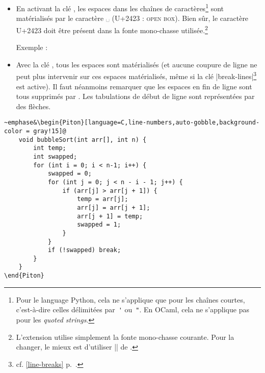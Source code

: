 \documentclass[dvipsnames,svgnames]{article}
\begin{document}
\begin{itemize}
Cette clé peut prendre comme valeur une longueur explicite mais aussi la valeur spéciale~|min|. Avec cette valeur,
la largeur sera calculée à partir de la largeur maximale des lignes de code. Attention : l'usage de cette valeur
spéciale~|min| requiert deux compilations LuaLaTeX\footnote{La largeur maximale est calculée lors de la première
compilation, écrite sur le fichier~|aux|, puis réutilisée lors de la compilation suivante. Certains outils comme
|latexmk| (utilisé par Overleaf) effectuent automatiquement un nombre suffisant de compilations.}.

Pour un exemple d'utilisation de |width=min|, voir la partie~\ref{example-comments} sur les exemples, p.~\pageref{example-comments}.

\item {} En activant la clé , les espaces dans les
chaînes de caractères\footnote{Pour le language Python, cela ne s'applique que pour les chaînes courtes, c'est-à-dire
celles délimitées par~\verb|'| ou~\verb|"|. En OCaml, cela ne s'applique pas pour les \emph{quoted strings}.} sont
matérialisés par le caractère ␣ (U+2423 : \textsc{open box}). Bien sûr, le caractère U+2423 doit être présent dans la fonte mono-chasse utilisée.\footnote{L'extension  utilise
  simplement la fonte mono-chasse courante. Pour la changer, le mieux est d'utiliser |\setmonofont| de
  .}\par\nobreak
%
\begingroup
{}
Exemple : 
\endgroup

\item {} Avec la clé , tous les espaces sont matérialisés (et aucune
coupure de ligne ne peut plus intervenir sur ces espaces matérialisés, même si la clé |break-lines|\footnote{cf.
  \ref{line-breaks} p.~\pageref{line-breaks}.} est active). Il faut néanmoins remarquer que les espaces en fin de
ligne sont tous supprimés par . Les tabulations de début de ligne sont représentées par des flèches.
\end{itemize}

\bigskip

\begingroup
{}
\begin{Verbatim}
~emphase&\begin{Piton}[language=C,line-numbers,auto-gobble,background-color = gray!15]@
    void bubbleSort(int arr[], int n) {
        int temp;
        int swapped;
        for (int i = 0; i < n-1; i++) {
            swapped = 0;
            for (int j = 0; j < n - i - 1; j++) {
                if (arr[j] > arr[j + 1]) {
                    temp = arr[j];
                    arr[j] = arr[j + 1];
                    arr[j + 1] = temp;
                    swapped = 1; 
                }
            }
            if (!swapped) break;
        }
    }   
\end{Piton}
\end{Verbatim}
\endgroup
\end{document}
